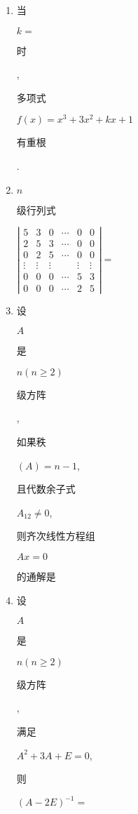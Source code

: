 \documentclass[10pt]{article}
\begin{document}
\begin{enumerate}
  \item \begin{CJK}{UTF8}{mj}当\end{CJK} $k=$ \begin{CJK}{UTF8}{mj}时\end{CJK}, \begin{CJK}{UTF8}{mj}多项式\end{CJK} $f(x)=x^{3}+3 x^{2}+k x+1$ \begin{CJK}{UTF8}{mj}有重根\end{CJK}.

  \item $n$ \begin{CJK}{UTF8}{mj}级行列式\end{CJK} $\left|\begin{array}{cccccc}5 & 3 & 0 & \cdots & 0 & 0 \\ 2 & 5 & 3 & \cdots & 0 & 0 \\ 0 & 2 & 5 & \cdots & 0 & 0 \\ \vdots & \vdots & \vdots & & \vdots & \vdots \\ 0 & 0 & 0 & \cdots & 5 & 3 \\ 0 & 0 & 0 & \cdots & 2 & 5\end{array}\right|=$

  \item \begin{CJK}{UTF8}{mj}设\end{CJK} $A$ \begin{CJK}{UTF8}{mj}是\end{CJK} $n(n \geqslant 2)$ \begin{CJK}{UTF8}{mj}级方阵\end{CJK}, \begin{CJK}{UTF8}{mj}如果秩\end{CJK} $(A)=n-1$, \begin{CJK}{UTF8}{mj}且代数余子式\end{CJK} $A_{12} \neq 0$, \begin{CJK}{UTF8}{mj}则齐次线性方程组\end{CJK} $A x=0$ \begin{CJK}{UTF8}{mj}的通解是\end{CJK}

  \item \begin{CJK}{UTF8}{mj}设\end{CJK} $A$ \begin{CJK}{UTF8}{mj}是\end{CJK} $n(n \geqslant 2)$ \begin{CJK}{UTF8}{mj}级方阵\end{CJK}, \begin{CJK}{UTF8}{mj}满足\end{CJK} $A^{2}+3 A+E=0$, \begin{CJK}{UTF8}{mj}则\end{CJK} $(A-2 E)^{-1}=$


\end{enumerate}
\end{document}
